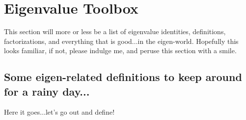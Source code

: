 \documentclass[paper=a4, fontsize=11pt]{scrartcl} %
\numberwithin{equation}{section} %
\numberwithin{figure}{section} %
\numberwithin{table}{section} %
\begin{document}
%
%

\section{Eigenvalue Toolbox}

This section will more or less be a list of eigenvalue identities, definitions, factorizations, and everything that is good$\ldots$in the eigen-world. Hopefully this looks familiar, if not, please indulge me, and peruse this section with a smile. \\


%
%
\subsection{Some eigen-related definitions to keep around for a rainy day...}

Here it goes$\ldots$let's go out and define!
\end{document}

